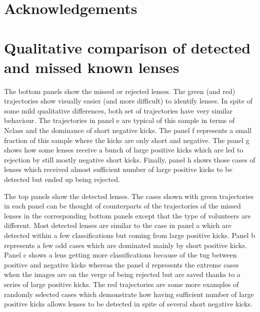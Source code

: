 \documentclass[useAMS,usenatbib,a4paper]{mn2e}
\begin{document}
\twocolumn
\section*{Acknowledgements}





\appendix

\section{Qualitative comparison of detected and missed known lenses}
\label{appendix:traj}

The bottom panels show the missed or rejected lenses. The green (and red)
trajectories show visually easier (and more difficult) to identify
lenses. In spite of some mild qualitative differences, both set of
trajectories have very similar behaviour. The trajectories in panel e
are typical of this sample in terms of Nclass and the dominance of short
negative kicks. The panel f represents a small fraction of this sample
where the kicks are only short and negative. The panel g shows how some
lenses receive a bunch of large positive kicks which are led to
rejection by still mostly negative short kicks. Finally, panel h shows
those cases of lenses which received almost sufficient number of large
positive kicks to be detected but ended up being rejected.

The top panels show the detected lenses. The cases shown with green trajectories
in each panel can be thought of counterparts of the trajectories of the missed
lenses in the corresponding bottom panels except that the type of volunteers are
different. Most detected lenses are similar to the case in panel a which are
detected within a few classifications but coming from large positive kicks.
Panel b represents a few odd cases which are dominated mainly by short positive
kicks. Panel c shows a lens getting more classifications because of the tug
between positive and negative kicks whereas the panel d represents the extreme
cases when the images are on the verge of being rejected but are saved thanks
to a series of large positive kicks. The red trajectories are some more
examples of randomly selected cases which demonstrate how having sufficient
number of large positive kicks allows lenses to be detected in spite of several
short negative kicks.
\end{document}
